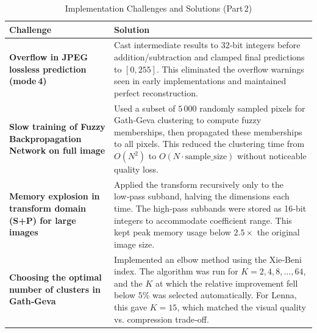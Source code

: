 \begin{table}[H]
\centering
\small
\caption{Implementation Challenges and Solutions (Part 2)}
\label{tab:challenges_b}
\begin{tabularx}{\textwidth}{|p{4.5cm}|X|}
\hline
\textbf{Challenge} & \textbf{Solution} \\
\hline
\textbf{Overflow in JPEG lossless prediction (mode 4)} & 
Cast intermediate results to 32‑bit integers before addition/subtraction and clamped final predictions to $[0,255]$. This eliminated the overflow warnings seen in early implementations and maintained perfect reconstruction. \\
\hline
\textbf{Slow training of Fuzzy Backpropagation Network on full image} & 
Used a subset of $5\,000$ randomly sampled pixels for Gath‑Geva clustering to compute fuzzy memberships, then propagated these memberships to all pixels. This reduced the clustering time from $O(N^2)$ to $O(N \cdot \text{sample\_size})$ without noticeable quality loss. \\
\hline
\textbf{Memory explosion in transform domain (S+P) for large images} & 
Applied the transform recursively only to the low‑pass subband, halving the dimensions each time. The high‑pass subbands were stored as 16‑bit integers to accommodate coefficient range. This kept peak memory usage below $2.5\times$ the original image size. \\
\hline
\textbf{Choosing the optimal number of clusters in Gath‑Geva} & 
Implemented an elbow method using the Xie‑Beni index. The algorithm was run for $K = 2,4,8,\dots,64$, and the $K$ at which the relative improvement fell below $5\%$ was selected automatically. For Lenna, this gave $K=15$, which matched the visual quality vs. compression trade‑off. \\
\hline
\end{tabularx}
\end{table}